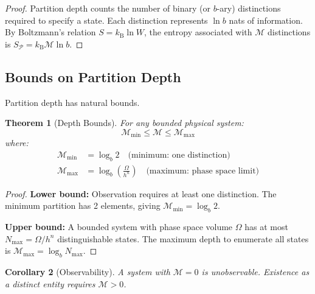 ﻿\documentclass[twocolumn,10pt,a4paper]{article}
\newtheorem{theorem}{Theorem}[section]
\newtheorem{corollary}[theorem]{Corollary}
\theoremstyle{definition}
\theoremstyle{remark}
\newcommand{\kB}{k_{\mathrm{B}}}
\newcommand{\Depth}{\mathcal{M}}
\newcommand{\Part}{\mathcal{P}}
\begin{document}
\begin{proof}
Partition depth counts the number of binary (or $b$-ary) distinctions required to specify a state. Each distinction represents $\ln b$ nats of information. By Boltzmann's relation $S = \kB \ln W$, the entropy associated with $\Depth$ distinctions is $S_{\Part} = \kB \Depth \ln b$.
\end{proof}

\subsection{Bounds on Partition Depth}

Partition depth has natural bounds.

\begin{theorem}[Depth Bounds]
\label{thm:bounds}
For any bounded physical system:
\begin{equation}
    \Depth_{\min} \leq \Depth \leq \Depth_{\max}
\end{equation}
where:
\begin{align}
    \Depth_{\min} &= \log_b 2 \quad \text{(minimum: one distinction)} \\
    \Depth_{\max} &= \log_b\left(\frac{\Omega}{h^n}\right) \quad \text{(maximum: phase space limit)}
\end{align}
\end{theorem}

\begin{proof}
\textbf{Lower bound:} Observation requires at least one distinction. The minimum partition has 2 elements, giving $\Depth_{\min} = \log_b 2$.

\textbf{Upper bound:} A bounded system with phase space volume $\Omega$ has at most $N_{\max} = \Omega/h^n$ distinguishable states. The maximum depth to enumerate all states is $\Depth_{\max} = \log_b N_{\max}$.
\end{proof}

\begin{corollary}[Observability]
\label{cor:observe}
A system with $\Depth = 0$ is unobservable. Existence as a distinct entity requires $\Depth > 0$.
\end{corollary}
\end{document}

